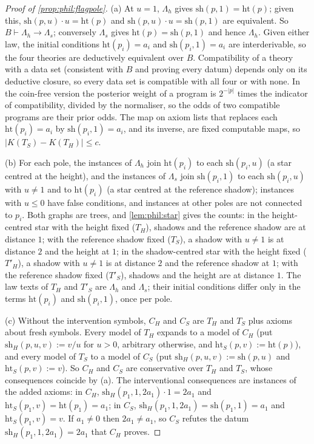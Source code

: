 \begin{proof}[Proof of \cref{prop:phil:flagpole}]
(a) At $u=1$, $\Lambda_h$ gives $\mathrm{sh}(p,1)=\mathrm{ht}(p)$; given this, $\mathrm{sh}(p,u)\cdot u=\mathrm{ht}(p)$ and $\mathrm{sh}(p,u)\cdot u=\mathrm{sh}(p,1)$ are equivalent. So $B\vdash\Lambda_h\to\Lambda_s$; conversely $\Lambda_s$ gives $\mathrm{ht}(p)=\mathrm{sh}(p,1)$ and hence $\Lambda_h$. Given either law, the initial conditions $\mathrm{ht}(p_i)=a_i$ and $\mathrm{sh}(p_i,1)=a_i$ are interderivable, so the four theories are deductively equivalent over $B$. Compatibility of a theory with a data set (consistent with $B$ and proving every datum) depends only on its deductive closure, so every data set is compatible with all four or with none. In the coin-free version the posterior weight of a program is $2^{-\lvert p\rvert}$ times the indicator of compatibility, divided by the normaliser, so the odds of two compatible programs are their prior odds. The map on axiom lists that replaces each $\mathrm{ht}(p_i)=a_i$ by $\mathrm{sh}(p_i,1)=a_i$, and its inverse, are fixed computable maps, so $\lvert K(T_S)-K(T_H)\rvert\le c$.

(b) For each pole, the instances of $\Lambda_h$ join $\mathrm{ht}(p_i)$ to each $\mathrm{sh}(p_i,u)$ (a star centred at the height), and the instances of $\Lambda_s$ join $\mathrm{sh}(p_i,1)$ to each $\mathrm{sh}(p_i,u)$ with $u\ne1$ and to $\mathrm{ht}(p_i)$ (a star centred at the reference shadow); instances with $u\le0$ have false conditions, and instances at other poles are not connected to $p_i$. Both graphs are trees, and \cref{lem:phil:star} gives the counts: in the height-centred star with the height fixed ($T_H$), shadows and the reference shadow are at distance $1$; with the reference shadow fixed ($T_S$), a shadow with $u\ne1$ is at distance $2$ and the height at $1$; in the shadow-centred star with the height fixed ($T'_H$), a shadow with $u\ne1$ is at distance $2$ and the reference shadow at $1$; with the reference shadow fixed ($T'_S$), shadows and the height are at distance $1$. The law texts of $T_H$ and $T'_S$ are $\Lambda_h$ and $\Lambda_s$; their initial conditions differ only in the terms $\mathrm{ht}(p_i)$ and $\mathrm{sh}(p_i,1)$, once per pole.

(c) Without the intervention symbols, $C_H$ and $C_S$ are $T_H$ and $T_S$ plus axioms about fresh symbols. Every model of $T_H$ expands to a model of $C_H$ (put $\mathrm{sh}_H(p,u,v):=v/u$ for $u>0$, arbitrary otherwise, and $\mathrm{ht}_S(p,v):=\mathrm{ht}(p)$), and every model of $T_S$ to a model of $C_S$ (put $\mathrm{sh}_H(p,u,v):=\mathrm{sh}(p,u)$ and $\mathrm{ht}_S(p,v):=v$). So $C_H$ and $C_S$ are conservative over $T_H$ and $T_S$, whose consequences coincide by (a). The interventional consequences are instances of the added axioms: in $C_H$, $\mathrm{sh}_H(p_1,1,2a_1)\cdot1=2a_1$ and $\mathrm{ht}_S(p_1,v)=\mathrm{ht}(p_1)=a_1$; in $C_S$, $\mathrm{sh}_H(p_1,1,2a_1)=\mathrm{sh}(p_1,1)=a_1$ and $\mathrm{ht}_S(p_1,v)=v$. If $a_1\ne0$ then $2a_1\ne a_1$, so $C_S$ refutes the datum $\mathrm{sh}_H(p_1,1,2a_1)=2a_1$ that $C_H$ proves.
\end{proof}

